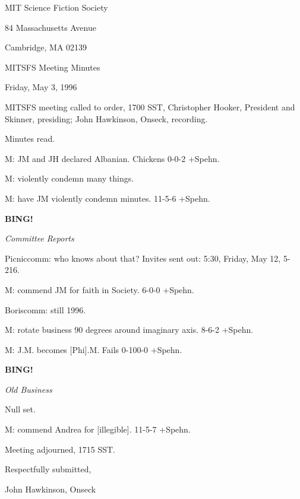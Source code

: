 \documentclass[12pt]{article}
\newcommand{\bing}{{\bf BING!} }
\newcommand{\goto}[1]{\bing \vskip 12pt \centerline{{\em{#1}}}}
\begin{document}
\begin{center}

MIT Science Fiction Society 

84 Massachusetts Avenue

Cambridge, MA 02139

\vspace{12pt}

MITSFS Meeting Minutes 

Friday, May 3, 1996

\end{center}
 
\vspace{18pt}

\setlength{\parskip}{6pt}

\noindent
MITSFS meeting called to order, 1700 SST,
Christopher Hooker, President and Skinner, presiding; John Hawkinson, Onseck, recording.

Minutes read.

M: JM and JH declared Albanian. Chickens 0-0-2 +Spehn.

M: violently condemn many things.

M: have JM violently condemn minutes. 11-5-6 +Spehn.

\goto{Committee Reports}

Picniccomm: who knows about that? Invites sent out: 5:30, Friday, May 12, 5-216.

M: commend JM for faith in Society. 6-0-0 +Spehn.

Boriscomm: still 1996.

M: rotate business 90 degrees around imaginary axis. 8-6-2 +Spehn.

M: J.M. becomes [Phi].M. Fails 0-100-0 +Spehn.

\goto{Old Business}

Null set.

M: commend Andrea for [illegible]. 11-5-7 +Spehn.

\vspace{12pt}

\noindent
Meeting adjourned, 1715 SST.

\vspace{18pt}

\centerline{Respectfully submitted,}
\centerline{John Hawkinson, Onseck}
\end{document}
